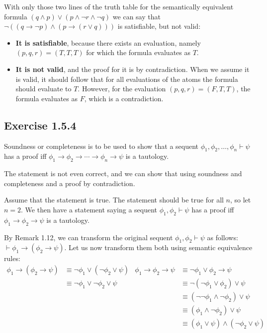 \documentclass{article}
\newcommand{\imp}{\ensuremath{\rightarrow}}
\newcommand{\seq}{\ensuremath{\vdash}}
\newcommand{\fneg}[1]{\ensuremath{\neg \left( #1 \right)}}
\newcommand{\fland}[2]{\ensuremath{\left( #1 \right) \land \left( #2 \right)}}
\newcommand{\flor}[2]{\ensuremath{\left( #1 \right) \lor \left( #2 \right)}}
\newcommand{\Fneg}[1]{\ensuremath{\neg #1}}
\newcommand{\FlanD}[2]{\ensuremath{#1 \land #2}}
\newcommand{\FloR}[2]{\ensuremath{#1 \lor #2}}
\newcommand{\FimP}[2]{\ensuremath{#1 \imp #2}}
\newcommand{\Fimp}[2]{\ensuremath{#1 \imp \left( #2 \right)}}
\begin{document}
With only those two lines of the truth table for the
semantically equivalent formula
$\flor{\FlanD{q}{p}}{p \land \Fneg{r} \land \Fneg{q}}$
we can say that
$\fneg{\fland{\FimP{q}{\Fneg{p}}}{\Fimp{p}{\FloR{r}{q}}}}$
is satisfiable, but not valid:
\begin{itemize}
\item
\textbf{It is satisfiable}, because there exists an evaluation,
namely $(p, q, r) = (T, T, T)$ for which
the formula evaluates as $T$.
\item
\textbf{It is not valid}, and the proof for it is by contradiction.
When we assume it is valid, it should follow that
for all evaluations of the atoms the formula should
evaluate to $T$. However, for the evaluation
$(p, q, r) = (F, T, T)$, the formula evaluates as $F$,
which is a contradiction.
\end{itemize}


\subsection{Exercise 1.5.4} %
Soundness or completeness is to be used to show that
a sequent $\phi_1, \phi_2, \dotsc, \phi_n \seq \psi$
has a proof iff
$\phi_1 \imp \phi_2 \imp \dotsb \imp \phi_n \imp \psi$
is a tautology.

The statement is not even correct, and we can show that using
soundness and completeness and a proof by contradiction.

Assume that the statement is true. The statement should be true
for all $n$, so let $n = 2$. We then have a statement saying
a sequent $\phi_1, \phi_2 \seq \psi$
has a proof iff $\phi_1 \imp \phi_2 \imp \psi$
is a tautology.

By Remark 1.12, we can transform
the original sequent $\phi_1, \phi_2 \seq \psi$
as follows: $\seq \phi_1 \imp (\phi_2 \imp \psi)$.
Let us now transform them both using semantic equivalence rules:
\begin{align*}
\phi_1 \imp (\phi_2 \imp \psi) &\equiv \neg\phi_1 \lor (\neg\phi_2 \lor \psi)  &  \phi_1 \imp \phi_2 \imp \psi &\equiv \neg\phi_1 \lor \phi_2 \imp \psi\\
                               &\equiv \neg\phi_1 \lor \neg\phi_2 \lor \psi    &                               &\equiv \neg(\neg\phi_1 \lor \phi_2) \lor \psi\\
                               &                                               &                               &\equiv (\neg\neg\phi_1 \land \neg\phi_2) \lor \psi\\
                               &                                               &                               &\equiv (\phi_1 \land \neg\phi_2) \lor \psi\\
                               &                                               &                               &\equiv (\phi_1 \lor \psi) \land (\neg\phi_2 \lor \psi)
\end{align*}
\end{document}
